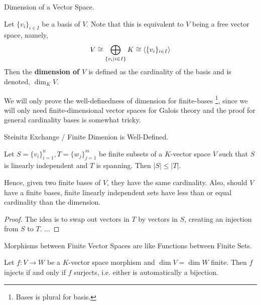\documentclass[../book.tex]{subfiles}
\begin{document}
\begin{dfn} Dimension of a Vector Space.

    Let $\{v_i\}_{i\in I}$ be a basis of $V$. 
    Note that this is equivalent to $V$ being a free vector space, namely, 
    \[
        V \cong \bigoplus_{\{v_i \mid i\in I\}} K \cong \langle\{v_i\}_{i\in I}\rangle 
    \]
    Then the \textbf{dimension of $V$} is defined as the cardinality of the basis
    and is denoted, $\dim_K V$. 
    
    We will only prove the well-definedness of dimension for finite-bases
    \footnote{Bases is plural for basis.}, 
    since we will only need finite-dimensional vector spaces for Galois theory
    and the proof for general cardinality bases is somewhat tricky. 
\end{dfn}
\begin{lem} Steinitz Exchange / Finite Dimenion is Well-Defined. 

    Let $S = \{v_i\}_{i=1}^n, T = \{w_j\}_{j=1}^m$ be finite subsets 
    of a $K$-vector space $V$ such that 
    $S$ is linearly independent and $T$ is spanning. 
    Then $|S| \leq |T|$.
    
    Hence, given two finite bases of $V$, they have the same cardinality. 
    Also, should $V$ have a finite bases,
    finite linearly independent sets have less than or equal cardinality
    than the dimension.
\end{lem}
\begin{proof}
    The idea is to swap out vectors in $T$ by vectors in $S$, 
    creating an injection from $S$ to $T$. 
    ...
\end{proof}
\begin{cor} Morphisms between Finite Vector Spaces 
are like Functions between Finite Sets. 

    Let $f : V \to W$ be a $K$-vector space morphism and $\dim V = \dim W$ finite.
    Then $f$ injects if and only if $f$ surjects, i.e.
    either is automatically a bijection. 
\end{cor}
\end{document}
